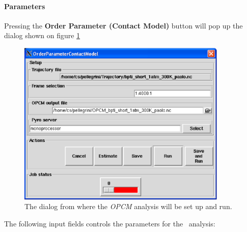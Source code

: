 \documentclass[a4paper,11pt]{report}
\begin{document}
\paragraph{Parameters\\}
\label{opcm_parameters}
Pressing the \textbf{Order Parameter (Contact Model)} button will pop up the dialog shown on figure \ref{fig:opcm}
\begin{figure}[h!]
\begin{center}
\includegraphics[width=10cm]{Figures/opcm.eps}
\end{center}
\caption[The \textit{OPCM} analysis dialog]{The dialog from where the \textit{OPCM} analysis will be set up and run.}
\label{fig:opcm}
\end{figure}   

The following input fields controls the parameters for the \OPCM\ analysis:
\end{document}
